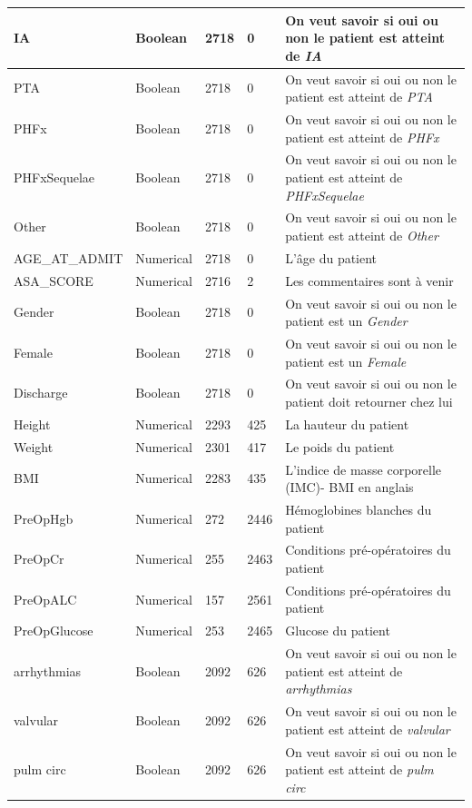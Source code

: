 \documentclass[12pt, french]{report}
\begin{document}
\begin{longtable}{ | p{} | p{} | p{}  | p{} | p{} |  }
IA & Boolean & 2718 & 0& On veut savoir si oui ou non le patient est atteint de \textit{IA} \\ \hline 
PTA & Boolean & 2718 & 0& On veut savoir si oui ou non le patient est atteint de \textit{PTA} \\ \hline 
PHFx & Boolean & 2718 & 0& On veut savoir si oui ou non le patient est atteint de \textit{PHFx} \\ \hline 
PHFxSequelae & Boolean & 2718 & 0& On veut savoir si oui ou non le patient est atteint de \textit{PHFxSequelae} \\ \hline 
Other & Boolean & 2718 & 0& On veut savoir si oui ou non le patient est atteint de \textit{Other} \\ \hline 
AGE\_AT\_ADMIT & Numerical & 2718 & 0 & L'âge du patient \\ \hline 
ASA\_SCORE & Numerical & 2716 & 2 & Les commentaires sont à venir \\ \hline 
Gender & Boolean & 2718 & 0& On veut savoir si oui ou non le patient est un \textit{Gender} \\ \hline 
Female & Boolean & 2718 & 0& On veut savoir si oui ou non le patient est un \textit{Female} \\ \hline 
Discharge & Boolean & 2718 & 0& On veut savoir si oui ou non le patient doit retourner chez lui \\ \hline 
Height & Numerical & 2293 & 425 & La hauteur du patient \\ \hline 
Weight & Numerical & 2301 & 417 & Le poids du patient \\ \hline 
BMI & Numerical & 2283 & 435 & L'indice de masse corporelle (IMC)- BMI en anglais \\ \hline 
PreOpHgb & Numerical & 272 & 2446 & Hémoglobines blanches du patient \\ \hline 
PreOpCr & Numerical & 255 & 2463 & Conditions pré-opératoires du patient \\ \hline 
PreOpALC & Numerical & 157 & 2561 &  Conditions pré-opératoires du patient \\ \hline 
PreOpGlucose & Numerical & 253 & 2465 & Glucose du patient \\ \hline 
arrhythmias & Boolean & 2092 & 626& On veut savoir si oui ou non le patient est atteint de \textit{arrhythmias} \\ \hline 
valvular & Boolean & 2092 & 626& On veut savoir si oui ou non le patient est atteint de \textit{valvular} \\ \hline 
pulm circ & Boolean & 2092 & 626& On veut savoir si oui ou non le patient est atteint de \textit{pulm circ} \\ \hline 

\end{longtable}
\end{document}
